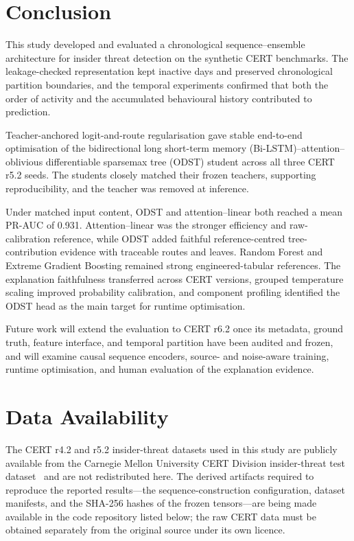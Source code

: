 \section{Conclusion}
\label{sec:conclusion}
This study developed and evaluated a chronological sequence--ensemble
architecture for insider threat detection on the synthetic CERT benchmarks.
The leakage-checked representation kept inactive days and preserved
chronological partition boundaries, and the temporal experiments confirmed
that both the order of activity and the accumulated behavioural history
contributed to prediction.

\smallskip
Teacher-anchored logit-and-route regularisation gave stable end-to-end
optimisation of the bidirectional long short-term memory
(Bi-LSTM)--attention--oblivious differentiable sparsemax tree (ODST) student
across all three CERT r5.2 seeds. The students closely matched their frozen
teachers, supporting reproducibility, and the teacher was removed at
inference.

\smallskip
Under matched input content, ODST and attention--linear both reached a mean
PR-AUC of 0.931. Attention--linear was the stronger efficiency and
raw-calibration reference, while ODST added faithful reference-centred
tree-contribution evidence with traceable routes and leaves. Random Forest
and Extreme Gradient Boosting remained strong engineered-tabular references.
The explanation faithfulness transferred across CERT versions, grouped
temperature scaling improved probability calibration, and component
profiling identified the ODST head as the main target for runtime
optimisation.

\smallskip
Future work will extend the evaluation to CERT r6.2 once its metadata,
ground truth, feature interface, and temporal partition have been audited
and frozen, and will examine causal sequence encoders, source- and
noise-aware training, runtime optimisation, and human evaluation of the
explanation evidence.

\section*{Data Availability}
The CERT r4.2 and r5.2 insider-threat datasets used in this study are publicly
available from the Carnegie Mellon University CERT Division insider-threat
test dataset~\cite{GlasserLindauer2013} and are not redistributed here. The
derived artifacts required to reproduce the reported results---the
sequence-construction configuration, dataset manifests, and the SHA-256 hashes
of the frozen tensors---are being made available in the code repository listed
below; the raw CERT data must be obtained separately from the original source
under its own licence.

